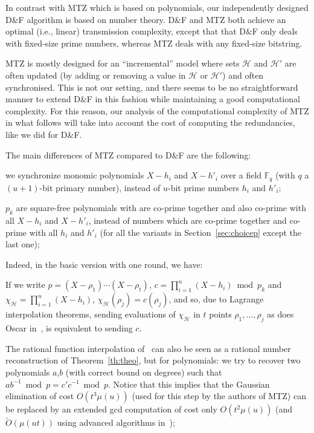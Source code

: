 \documentclass[twoside,envcountsame,runningheads]{llncs}
\newcommand{\Oapp}{\ensuremath{\tilde{O}}}
\newcommand{\Set}{\mathcal{H}}
\newcommand{\df}{D\&F\xspace}
\begin{document}
In contrast with MTZ which is based on polynomials, our
independently designed \df algorithm is based on number theory.
\df and MTZ both achieve an optimal (i.e., linear) transmission complexity,
except that
that \df only deals with fixed-size prime numbers, whereas MTZ deals with any
fixed-size bitstring. 

MTZ is mostly designed for an ``incremental'' model where sets $\Set$ and
$\Set'$ are often updated (by adding or removing a value in $\Set$ or $\Set'$)
and often synchronised. This is not our setting, and there seems to be no
straightforward manner to extend \df in this fashion while maintaining a good
computational complexity. For this reason, our analysis of the computational
complexity of MTZ in what follows will take into account the cost of computing
the redundancies, like we did for \df.

The main differences of MTZ compared to \df are the following:
\begin{compactitem}
\item we synchronize monomic polynomials $X-h_i$ and $X-h'_i$ over a field $\mathbb{F}_q$ (with $q$ a $(u+1)$-bit primary number), instead of $u$-bit prime numbers $h_i$ and $h'_i$;
\item $p_k$ are square-free polynomials with are co-prime together and also co-prime with all $X-h_i$ and $X-h'_i$, instead of numbers which are co-prime together and co-prime with all $h_i$ and $h'_i$ (for all the variants in Section~\ref{sec:choicep} except the last one);
\end{compactitem}

Indeed, in the basic version with one round, we have:
\begin{compactitem}
\item If we write $p = (X-\rho_1) \cdots (X-\rho_t)$, $c = \prod_{i=1}^n (X-h_i) \bmod p_k$ and $\chi_\Set = \prod_{i=1}^n (X-h_i)$, $\chi_\Set(\rho_j) = c(\rho_j)$, and so, due to Lagrange interpolation theorems, sending evaluations of $\chi_\Set$ in $t$ points $\rho_1,\dots,\rho_j$ as does Oscar in~\cite{Mins1}, is equivalent to sending $c$.
\item The rational function interpolation of~\cite{Mins1} can also be seen as a rational number reconstruction of Theorem~\ref{th:theo}, but for polynomials: we try to recover two polynomials $a$,$b$ (with correct bound on degrees) such that $a b^{-1} \bmod p = c' c^{-1} \bmod p$.
Notice that this implies that the Gaussian elimination of cost $O(t^3 \mu(u))$ (used for this step by the authors of MTZ) can be replaced by an extended gcd computation of cost only $O(t^2 \mu(u))$ (and $\Oapp(\mu(ut))$ using advanced algorithms in~\cite{pan2004rational,wang2003acceleration});
\end{compactitem}
\end{document}
